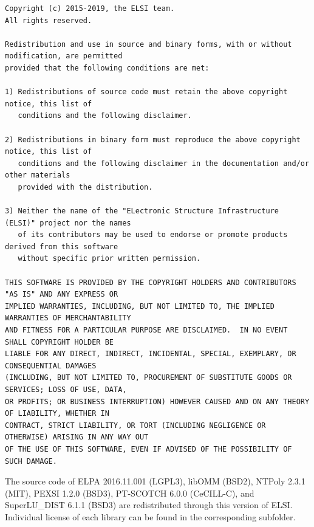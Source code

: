 \documentclass{report}
\begin{document}
\begin{tcolorbox}
\begin{Verbatim}
Copyright (c) 2015-2019, the ELSI team.
All rights reserved.

Redistribution and use in source and binary forms, with or without modification, are permitted
provided that the following conditions are met:

1) Redistributions of source code must retain the above copyright notice, this list of
   conditions and the following disclaimer.

2) Redistributions in binary form must reproduce the above copyright notice, this list of
   conditions and the following disclaimer in the documentation and/or other materials
   provided with the distribution.

3) Neither the name of the "ELectronic Structure Infrastructure (ELSI)" project nor the names
   of its contributors may be used to endorse or promote products derived from this software
   without specific prior written permission.

THIS SOFTWARE IS PROVIDED BY THE COPYRIGHT HOLDERS AND CONTRIBUTORS "AS IS" AND ANY EXPRESS OR
IMPLIED WARRANTIES, INCLUDING, BUT NOT LIMITED TO, THE IMPLIED WARRANTIES OF MERCHANTABILITY
AND FITNESS FOR A PARTICULAR PURPOSE ARE DISCLAIMED.  IN NO EVENT SHALL COPYRIGHT HOLDER BE
LIABLE FOR ANY DIRECT, INDIRECT, INCIDENTAL, SPECIAL, EXEMPLARY, OR CONSEQUENTIAL DAMAGES
(INCLUDING, BUT NOT LIMITED TO, PROCUREMENT OF SUBSTITUTE GOODS OR SERVICES; LOSS OF USE, DATA,
OR PROFITS; OR BUSINESS INTERRUPTION) HOWEVER CAUSED AND ON ANY THEORY OF LIABILITY, WHETHER IN
CONTRACT, STRICT LIABILITY, OR TORT (INCLUDING NEGLIGENCE OR OTHERWISE) ARISING IN ANY WAY OUT
OF THE USE OF THIS SOFTWARE, EVEN IF ADVISED OF THE POSSIBILITY OF SUCH DAMAGE.
\end{Verbatim}
\end{tcolorbox}

The source code of ELPA 2016.11.001 (LGPL3), libOMM (BSD2), NTPoly 2.3.1 (MIT), PEXSI 1.2.0 (BSD3), PT-SCOTCH 6.0.0 (CeCILL-C), and SuperLU\_DIST 6.1.1 (BSD3) are redistributed through this version of ELSI.  Individual license of each library can be found in the corresponding subfolder.
\end{document}
